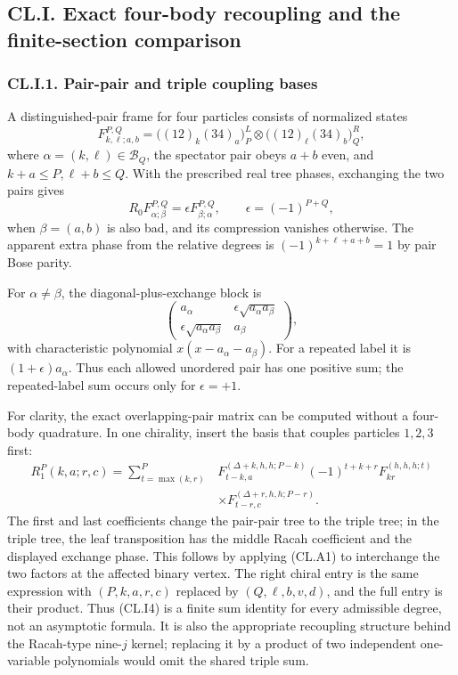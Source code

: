 \documentclass[a4paper,11pt]{article}
\numberwithin{equation}{section}
\begin{document}
\hypertarget{cl.i.-exact-four-body-recoupling-and-the-finite-section-comparison}{%
\subsection{CL.I. Exact four-body recoupling and the finite-section comparison}\label{cl.i.-exact-four-body-recoupling-and-the-finite-section-comparison}}

\hypertarget{cl.i.1.-pair-pair-and-triple-coupling-bases}{%
\subsubsection{CL.I.1. Pair-pair and triple coupling bases}\label{cl.i.1.-pair-pair-and-triple-coupling-bases}}

A distinguished-pair frame for four particles consists of normalized states \[
F_{k,\ell;a,b}^{P,Q}
=\bigl((12)_k(34)_a\bigr)_P^L
 \otimes\bigl((12)_\ell(34)_b\bigr)_Q^R,
\tag{CL.I1}
\] where \(\alpha=(k,\ell)\in\mathcal B_Q\), the spectator pair obeys \(a+b\) even, and \(k+a\leq P,\ell+b\leq Q\). With the prescribed real tree phases, exchanging the two pairs gives \[
R_0F_{\alpha;\beta}^{P,Q}
=\epsilon F_{\beta;\alpha}^{P,Q},\qquad
\epsilon=(-1)^{P+Q},
\tag{CL.I2}
\] when \(\beta=(a,b)\) is also bad, and its compression vanishes otherwise. The apparent extra phase from the relative degrees is \((-1)^{k+\ell+a+b}=1\) by pair Bose parity.

For \(\alpha\ne\beta\), the diagonal-plus-exchange block is \[
\begin{pmatrix}
a_\alpha&\epsilon\sqrt{a_\alpha a_\beta}\\
\epsilon\sqrt{a_\alpha a_\beta}&a_\beta
\end{pmatrix},
\tag{CL.I3}
\] with characteristic polynomial \(x(x-a_\alpha-a_\beta)\). For a repeated label it is \((1+\epsilon)a_\alpha\). Thus each allowed unordered pair has one positive sum; the repeated-label sum occurs only for \(\epsilon=+1\).

For clarity, the exact overlapping-pair matrix can be computed without a four-body quadrature. In one chirality, insert the basis that couples particles \(1,2,3\) first: \[
\begin{split}
R_1^P(k,a;r,c)
=\sum_{t=\max(k,r)}^P
&F_{t-k,a}^{(\Delta+k,h,h;P-k)}
(-1)^{t+k+r}F_{kr}^{(h,h,h;t)}\\
&\times F_{t-r,c}^{(\Delta+r,h,h;P-r)}.
\end{split}
\tag{CL.I4}
\] The first and last coefficients change the pair-pair tree to the triple tree; in the triple tree, the leaf transposition has the middle Racah coefficient and the displayed exchange phase. This follows by applying (CL.A1) to interchange the two factors at the affected binary vertex. The right chiral entry is the same expression with \((P,k,a,r,c)\) replaced by \((Q,\ell,b,v,d)\), and the full entry is their product. Thus (CL.I4) is a finite sum identity for every admissible degree, not an asymptotic formula. It is also the appropriate recoupling structure behind the Racah-type nine-\(j\) kernel; replacing it by a product of two independent one-variable polynomials would omit the shared triple sum.
\end{document}

